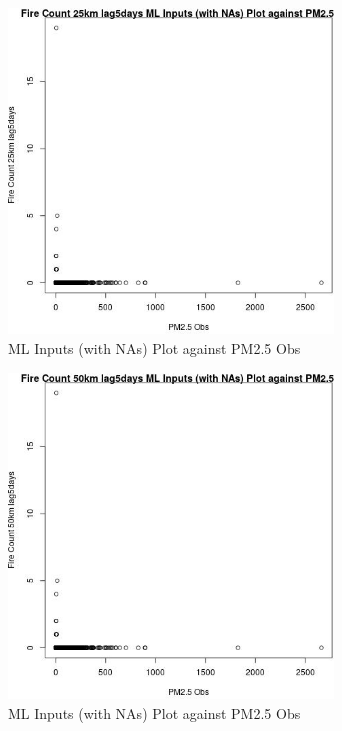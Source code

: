 \begin{figure} 
\centering  
\includegraphics[width=0.77\textwidth]{Code_Outputs/Report_ML_input_PM25_Step4_part_e_de_duplicated_aves_compiled_2019-05-20wNAs_Fire_Count_25km_lag5daysvPM25_Obs.jpg} 
\caption{\label{fig:Report_ML_input_PM25_Step4_part_e_de_duplicated_aves_compiled_2019-05-20wNAsFire_Count_25km_lag5daysvPM25_Obs}ML Inputs (with NAs) Plot against PM2.5 Obs} 
\end{figure} 
 

\begin{figure} 
\centering  
\includegraphics[width=0.77\textwidth]{Code_Outputs/Report_ML_input_PM25_Step4_part_e_de_duplicated_aves_compiled_2019-05-20wNAs_Fire_Count_50km_lag5daysvPM25_Obs.jpg} 
\caption{\label{fig:Report_ML_input_PM25_Step4_part_e_de_duplicated_aves_compiled_2019-05-20wNAsFire_Count_50km_lag5daysvPM25_Obs}ML Inputs (with NAs) Plot against PM2.5 Obs} 
\end{figure} 
 

